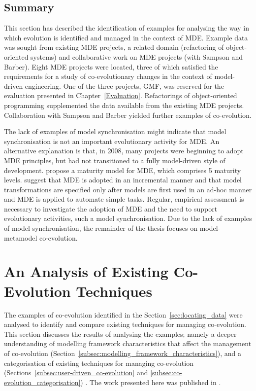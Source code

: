 \subsection{Summary}
This section has described the identification of examples for analysing the way in which evolution is identified and managed in the context of MDE. Example data was sought from existing MDE projects, a related domain (refactoring of object-oriented systems) and collaborative work on MDE projects (with Sampson and Barber). Eight MDE projects were located, three of which satisfied the requirements for a study of co-evolutionary changes in the context of model-driven engineering. One of the three projects, GMF, was reserved for the evaluation presented in Chapter~\ref{Evaluation}. Refactorings of object-oriented programming supplemented the data available from the existing MDE projects. Collaboration with Sampson and Barber yielded further examples of co-evolution.

The lack of examples of model synchronisation might indicate that model synchronisation is not an important evolutionary activity for MDE. An alternative explanation is that, in 2008, many projects were beginning to adopt MDE principles, but had not transitioned to a fully model-driven style of development. \cite{rios06mdd_maturity} propose a maturity model for MDE, which comprises 5 maturity levels. \cite{rios06mdd_maturity} suggest that MDE is adopted in an incremental manner and that model transformations are specified only after models are first used in an ad-hoc manner and MDE is applied to automate simple tasks. Regular, empirical assessment is necessary to investigate the adoption of MDE and the need to support evolutionary activities, such a model synchronisation. Due to the lack of examples of model synchronisation, the remainder of the thesis focuses on model-metamodel co-evolution.

\section{An Analysis of Existing Co-Evolution Techniques}
\label{sec:analysing_existing_techniques}
The examples of co-evolution identified in the Section~\ref{sec:locating_data} were analysed to identify and compare existing techniques for managing co-evolution. This section discusses the results of analysing the examples; namely a deeper understanding of modelling framework characteristics that affect the management of co-evolution (Section~\ref{subsec:modelling_framework_characteristics}), and a categorisation of existing techniques for managing co-evolution (Sections~\ref{subsec:user-driven_co-evolution} and \ref{subsec:co-evolution_categorisation}) . The work presented here was published in \cite{rose09analysis,rose09enhanced}.


